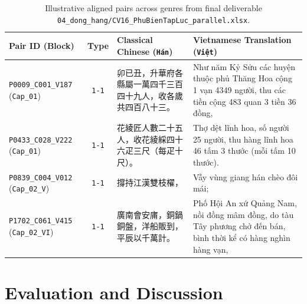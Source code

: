 \documentclass[a4paper]{article}
\begin{document}
\vspace{-3pt}
\begin{table}[!htb]
\centering
\caption{Illustrative aligned pairs across genres from final deliverable \texttt{04\_dong\_hang/CV16\_PhuBienTapLuc\_parallel.xlsx}.}
\label{tab:examples}
\scriptsize
\renewcommand{\arraystretch}{1.08}
\begin{tabularx}{\textwidth}{@{}l c L{5.75cm} Y@{}}
\toprule
\textbf{Pair ID (Block)} & \textbf{Type} & \textbf{Classical Chinese (\texttt{Hán})} & \textbf{Vietnamese Translation (\texttt{Việt})} \\
\midrule
\texttt{P0009\_C001\_V187} (\texttt{Cap\_01}) & \texttt{1-1} & 卯已丑，升華府各縣屬一萬四千三百四十九人，收各歲共四百八十三。 & Như năm Kỷ Sửu các huyện thuộc phủ Thăng Hoa cộng 1 vạn 4349 người, thu các tiền cộng 483 quan 3 tiền 36 đồng, \\
\texttt{P0433\_C028\_V222} (\texttt{Cap\_01}) & \texttt{1-1} & 花綾匠人數二十五人，收花綾綵四十六疋三尺（每疋十尺）。 & Thợ dệt lĩnh hoa, số người 25 người, thu hàng lĩnh hoa 46 tấm 3 thước (mỗi tấm 10 thước). \\
\texttt{P0839\_C004\_V012} (\texttt{Cap\_02\_V}) & \texttt{1-1} & 撐持江漢雙枝櫂， & Vẫy vùng giang hán chèo đôi mái; \\
\texttt{P1702\_C061\_V415} (\texttt{Cap\_02\_VI}) & \texttt{1-1} & 廣南會安庯，銅鍋銅盤，洋船販到，平辰以千萬計。 & Phố Hội An xứ Quảng Nam, nồi đồng mâm đồng, do tàu Tây phương chở đến bán, bình thời kể có hàng nghìn hàng vạn, \\
\bottomrule
\end{tabularx}
\end{table}

\section{Evaluation and Discussion}
\end{document}
